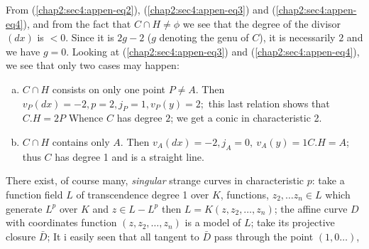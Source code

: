 From (\ref{chap2:sec4:appen-eq2}), (\ref{chap2:sec4:appen-eq3}) and
(\ref{chap2:sec4:appen-eq4}), and from the fact that $C\cap H \neq \phi$  we see
that the degree of the divisor $(dx)$ is $<0$. Since it is $2g -2$
($g$ denoting the genu of $C$), it is necessarily $2$ and we have $g =
0$. Looking at (\ref{chap2:sec4:appen-eq3}) and (\ref{chap2:sec4:appen-eq4}), 
we see that only two cases may happen: 
\begin{enumerate}[a)]
\item $C\cap H$ consists on only one point $P\neq A$. Then
  $v_P(dx)=-2, p=2, j_P=1, v_P(y)=2;$ this last relation shows that
  $C.H=2P$ Whence  $C$ has degree $2$; we get a conic in characteristic
  2. 
\item $C\cap H$ contains only $A$. Then $v_A(dx)=-2,j_A=0,~ v_A(y)=1
  C.H=A$; thus $C$ has degree 1 and is a straight line.  
\end{enumerate}

\begin{remark*} %
  There exist, of course many, \textit{singular} strange curves in
  characteristic $p$: take a function  field $L$ of transcendence
  degree 1 over $K$, functions, $z_2,\ldots z_n\in L$ which generate $L^p$
  over $K$ and $z\in L-L^p$  then $L=K(z,z_2,\ldots ,z_n)$; the affine
  curve $D$ with coordinates function $(z,z_2,\ldots , z_n)$ is a
  model of $L$; take its projective closure $\bar{D}$; It i easily
  seen that all tangent to $\bar{D}$ pass through the point $(1,0
  \ldots )$,  
\end{remark*}
